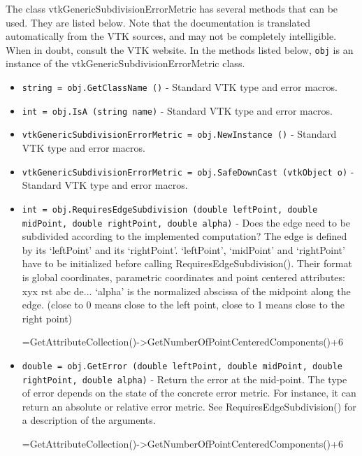 The class vtkGenericSubdivisionErrorMetric has several methods that can be used.
  They are listed below.
Note that the documentation is translated automatically from the VTK sources,
and may not be completely intelligible.  When in doubt, consult the VTK website.
In the methods listed below, \verb|obj| is an instance of the vtkGenericSubdivisionErrorMetric class.
\begin{itemize}
\item  \verb|string = obj.GetClassName ()| -  Standard VTK type and error macros.

\item  \verb|int = obj.IsA (string name)| -  Standard VTK type and error macros.

\item  \verb|vtkGenericSubdivisionErrorMetric = obj.NewInstance ()| -  Standard VTK type and error macros.

\item  \verb|vtkGenericSubdivisionErrorMetric = obj.SafeDownCast (vtkObject o)| -  Standard VTK type and error macros.

\item  \verb|int = obj.RequiresEdgeSubdivision (double leftPoint, double midPoint, double rightPoint, double alpha)| -  Does the edge need to be subdivided according to the implemented
 computation?
 The edge is defined by its `leftPoint' and its `rightPoint'.
 `leftPoint', `midPoint' and `rightPoint' have to be initialized before
 calling RequiresEdgeSubdivision().
 Their format is global coordinates, parametric coordinates and
 point centered attributes: xyx rst abc de...
 `alpha' is the normalized abscissa of the midpoint along the edge.
 (close to 0 means close to the left point, close to 1 means close to the
 right point)
 
 
 
 
 
          =GetAttributeCollection()->GetNumberOfPointCenteredComponents()+6

\item  \verb|double = obj.GetError (double leftPoint, double midPoint, double rightPoint, double alpha)| -  Return the error at the mid-point. The type of error depends on the state
 of the concrete error metric. For instance, it can return an absolute
 or relative error metric.
 See RequiresEdgeSubdivision() for a description of the arguments.
 
 
 
 
 
          =GetAttributeCollection()->GetNumberOfPointCenteredComponents()+6
 


\end{itemize}
